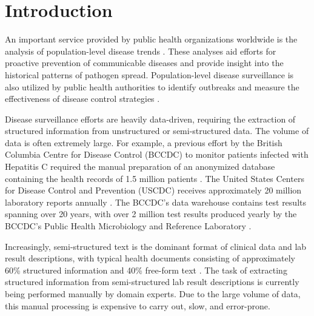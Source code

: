 \documentclass[sigconf]{acmart}
\begin{document}

\maketitle

\section{Introduction}

An important service provided by public health organizations worldwide is the analysis of population-level disease trends \cite{bc_centre_for_disease_control} \cite{surveillance_strategy_report}. These analyses aid efforts for proactive prevention of communicable diseases and provide insight into the historical patterns of pathogen spread. Population-level disease surveillance is also utilized by public health authorities to identify outbreaks and measure the effectiveness of disease control strategies \cite{surveillance_strategy_report}.

Disease surveillance efforts are heavily data-driven, requiring the extraction of structured information from unstructured or semi-structured data. The volume of data is often extremely large. For example, a previous effort by the British Columbia Centre for Disease Control (BCCDC) to monitor patients infected with Hepatitis C required the manual preparation of an anonymized database containing the health records of 1.5 million patients \cite{janjua2016assessing}. The United States Centers for Disease Control and Prevention (USCDC) receives approximately 20 million laboratory reports annually \cite{surveillance_strategy_report}. The BCCDC's data warehouse contains test results spanning over 20 years, with over 2 million test results produced yearly by the BCCDC's Public Health Microbiology and Reference Laboratory \cite{laboratory_program_highlights}.

Increasingly, semi-structured text is the dominant format of clinical data and lab result descriptions, with typical health documents consisting of approximately 60\% structured information and 40\% free-form text \cite{suominen2014guest} \cite{dalianis2009stockholm}. The task of extracting structured information from semi-structured lab result descriptions is currently being performed manually by domain experts. Due to the large volume of data, this manual processing is expensive to carry out, slow, and error-prone.
\end{document}
